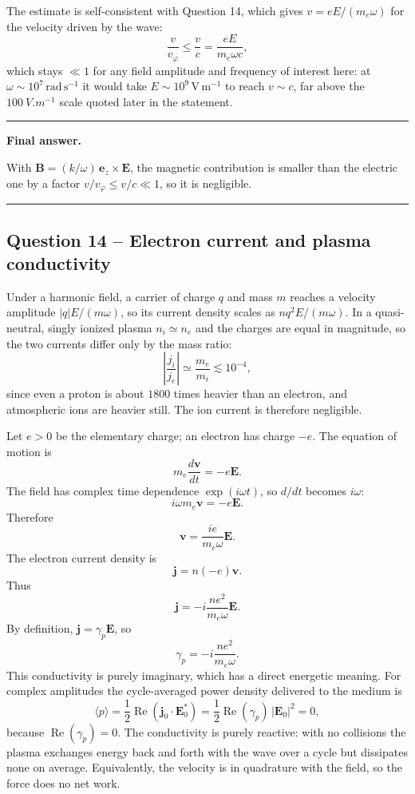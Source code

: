 \documentclass[11pt,a4paper]{article}
\newenvironment{finalanswer}{%
  \begin{center}\begin{minipage}{0.94\linewidth}\hrule\vspace{0.45em}\textbf{Final answer. }%
}{%
  \vspace{0.45em}\hrule\end{minipage}\end{center}%
}
\newcommand{\E}{\mathbf{E}}
\newcommand{\B}{\mathbf{B}}
\newcommand{\jv}{\mathbf{j}}
\begin{document}
The estimate is self-consistent with Question 14, which gives $v=eE/(m_e\omega)$
for the velocity driven by the wave:
\[
 \frac{v}{v_\varphi}\leq\frac{v}{c}=\frac{eE}{m_e\omega c},
\]
which stays $\ll1$ for any field amplitude and frequency of interest here: at
$\omega\sim10^{7}\,\mathrm{rad\,s^{-1}}$ it would take
$E\sim10^{9}\,\mathrm{V\,m^{-1}}$ to reach $v\sim c$, far above the
$\SI{100}{V.m^{-1}}$ scale quoted later in the statement.

\begin{finalanswer}
With $\B=(k/\omega)\,\mathbf e_z\times\E$, the magnetic contribution is smaller than the electric one by a factor $v/v_\varphi\leq v/c\ll1$, so it is negligible.
\end{finalanswer}

\subsection*{Question 14 -- Electron current and plasma conductivity}

Under a harmonic field, a carrier of charge $q$ and mass $m$ reaches a velocity
amplitude $|q|E/(m\omega)$, so its current density scales as $nq^2E/(m\omega)$. In
a quasi-neutral, singly ionized plasma $n_i\simeq n_e$ and the charges are equal
in magnitude, so the two currents differ only by the mass ratio:
\[
 \left|\frac{j_i}{j_e}\right|\simeq\frac{m_e}{m_i}\lesssim10^{-4},
\]
since even a proton is about $1800$ times heavier than an electron, and
atmospheric ions are heavier still. The ion current is therefore negligible.

Let $e>0$ be the elementary charge; an electron has charge $-e$. The equation of motion is
\[
 m_e\frac{d\mathbf{v}}{dt}=-e\E.
\]
The field has complex time dependence $\exp(i\omega t)$, so $d/dt$ becomes $i\omega$:
\[
 i\omega m_e\mathbf{v}=-e\E.
\]
Therefore
\[
 \mathbf{v}=\frac{i e}{m_e\omega}\E.
\]
The electron current density is
\[
 \jv=n(-e)\mathbf{v}.
\]
Thus
\[
 \jv=-i\frac{n e^2}{m_e\omega}\E.
\]
By definition, $\jv=\gamma_p\E$, so
\[
 \gamma_p=-i\frac{n e^2}{m_e\omega}.
\]
This conductivity is purely imaginary, which has a direct energetic meaning. For
complex amplitudes the cycle-averaged power density delivered to the medium is
\[
 \langle p\rangle=\frac12\operatorname{Re}\left(\jv_0\cdot\E_0^{*}\right)
 =\frac12\operatorname{Re}(\gamma_p)\,|\E_0|^2=0 ,
\]
because $\operatorname{Re}(\gamma_p)=0$. The conductivity is purely reactive: with
no collisions the plasma exchanges energy back and forth with the wave over a
cycle but dissipates none on average. Equivalently, the velocity is in quadrature
with the field, so the force does no net work.
\end{document}
